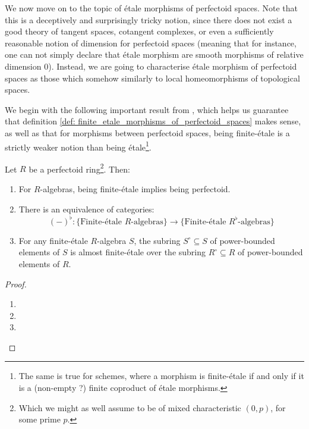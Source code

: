             We now move on to the topic of \'etale morphisms of perfectoid spaces. Note that this is a deceptively and surprisingly tricky notion, since there does not exist a good theory of tangent spaces, cotangent complexes, or even a sufficiently reasonable notion of dimension for perfectoid spaces (meaning that for instance, one can not simply declare that \'etale morphism are smooth morphisms of relative dimension $0$). Instead, we are going to characterise \'etale morphism of perfectoid spaces as those which somehow  similarly to local homeomorphisms of topological spaces. 
            
            We begin with the following important result from \cite{scholze2011perfectoid}, which helps us guarantee that definition \ref{def: finite_etale_morphisms_of_perfectoid_spaces} makes sense, as well as that for morphisms between perfectoid spaces, being finite-\'etale is a strictly weaker notion than being \'etale\footnote{The same is true for schemes, where a morphism is finite-\'etale if and only if it is a (non-empty ?) finite coproduct of \'etale morphisms.}.
            \begin{theorem} \label{theorem: almost_purity_perfectoid_version}
                Let $R$ be a perfectoid ring\footnote{Which we might as well assume to be of mixed characteristic $(0, p)$, for some prime $p$.}. Then:
                    \begin{enumerate}
                        \item For $R$-algebras, being finite-\'etale implies being perfectoid.
                        \item There is an equivalence of categories:
                            $$(-)^{\flat}: \{\text{Finite-\'etale $R$-algebras}\} \to \{\text{Finite-\'etale $R^{\flat}$-algebras}\}$$
                        \item For any finite-\'etale $R$-algebra $S$, the subring $S^{\circ} \subseteq S$ of power-bounded elements of $S$ is almost finite-\'etale over the subring $R^{\circ} \subseteq R$ of power-bounded elements of $R$.
                    \end{enumerate}
            \end{theorem}
                \begin{proof}
                    \noindent
                    \begin{enumerate}
                        \item 
                        \item 
                        \item 
                    \end{enumerate}
                \end{proof}
